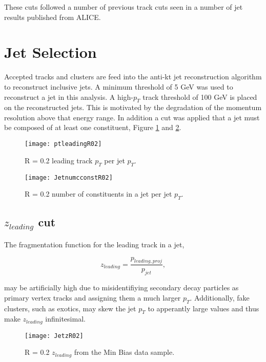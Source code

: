 \noindent
These cuts followed a number of previous track cuts seen in a number of jet results published from ALICE\cite{Acharya:2018eat}.
\newpage
\section{Jet Selection}

Accepted tracks and clusters are feed into the anti-kt jet reconstruction algorithm to reconstruct inclusive jets.  A minimum threshold of 5 GeV was used to reconstruct a jet in this analysis.  A high-$p_{T}$ track threshold of 100 GeV is placed on the reconstructed jets.  This is motivated by the degradation of the momentum resolution above that energy range.  In addition a cut was applied that a jet must be composed of at least one constituent, Figure \ref{fig:JetPt} and \ref{fig:JetConst}.

\begin{figure}[h]
\texttt{[image: ptleadingR02]}
\centering
\caption{R = 0.2 leading track $p_{T}$ per jet $p_{T}$.}
\label{fig:JetPt}
\end{figure}

\begin{figure}[h]
\texttt{[image: JetnumcconstR02]}
\centering
\caption{R = 0.2 number of constituents in a jet per jet $p_{T}$.}
\label{fig:JetConst}
\end{figure}



\noindent
\subsection{$z_{leading}$ cut}

The fragmentation function for the leading track in a jet,

\begin{equation}
z_{leading} = \frac{ p_{leading, proj} }{ p_{jet} },
\label{eq:zleading}
\end{equation}

\noindent
may be artificially high due to misidentifiying secondary decay particles as primary vertex tracks and assigning them a much larger $p_{T}$.  Additionally, fake clusters, such as exotics, may skew the jet $p_{T}$ to apperantly large values and thus make $z_{leading}$ infinitesimal.  

\begin{figure}[h]
\texttt{[image: JetzR02]}
\centering
\caption{R = 0.2 $z_{leading}$ from the Min Bias data sample.}
\label{fig:Jetz}
\end{figure}

